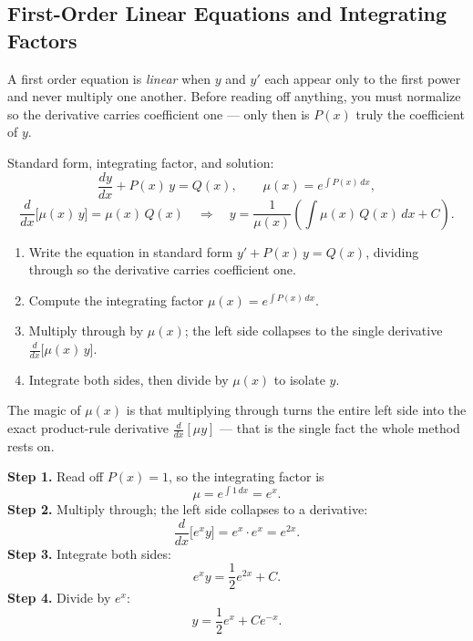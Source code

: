 \subsection{First-Order Linear Equations and Integrating Factors}

A first order equation is \emph{linear} when $y$ and $y'$ each appear only to
the first power and never multiply one another. Before reading off anything,
you must normalize so the derivative carries coefficient one --- only then is
$P(x)$ truly the coefficient of $y$.

\begin{formulabox}
Standard form, integrating factor, and solution:
\[
    \frac{dy}{dx} + P(x)\,y = Q(x),
    \qquad
    \mu(x) = e^{\int P(x)\,dx},
\]
\[
    \frac{d}{dx}\big[\mu(x)\,y\big] = \mu(x)\,Q(x)
    \quad\Longrightarrow\quad
    y = \frac{1}{\mu(x)}\left( \int \mu(x)\,Q(x)\,dx + C \right).
\]
\end{formulabox}

\begin{methodbox}
\begin{enumerate}[leftmargin=1.6em, itemsep=2pt]
    \item Write the equation in standard form $y' + P(x)\,y = Q(x)$, dividing
          through so the derivative carries coefficient one.
    \item Compute the integrating factor $\mu(x) = e^{\int P(x)\,dx}$.
    \item Multiply through by $\mu(x)$; the left side collapses to the single
          derivative $\frac{d}{dx}\big[\mu(x)\,y\big]$.
    \item Integrate both sides, then divide by $\mu(x)$ to isolate $y$.
\end{enumerate}
\end{methodbox}

\noindent The magic of $\mu(x)$ is that multiplying through turns the entire
left side into the exact product-rule derivative $\frac{d}{dx}[\mu y]$ ---
that is the single fact the whole method rests on.

\begin{examplebox}[Worked Example 2.2: Solve $\frac{dy}{dx} + y = e^{x}$]
\textbf{Step 1.} Read off $P(x) = 1$, so the integrating factor is
\[ \mu = e^{\int 1\,dx} = e^{x}. \]
\textbf{Step 2.} Multiply through; the left side collapses to a derivative:
\[ \frac{d}{dx}\big[e^{x}y\big] = e^{x}\cdot e^{x} = e^{2x}. \]
\textbf{Step 3.} Integrate both sides:
\[ e^{x}y = \frac{1}{2}e^{2x} + C. \]
\textbf{Step 4.} Divide by $e^{x}$:
\[ y = \frac{1}{2}e^{x} + C e^{-x}. \]
\end{examplebox}

